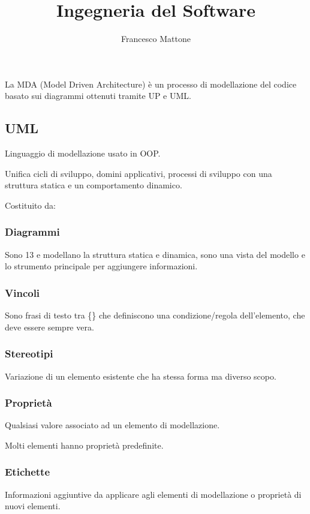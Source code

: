 \documentclass{report}
\title{Ingegneria del Software}
\author{Francesco Mattone}
\begin{document}
\tableofcontents
\maketitle

\chapter{}
La MDA (Model Driven Architecture) è un processo di modellazione del codice basato sui diagrammi ottenuti tramite UP e UML.

\section{UML}
Linguaggio di modellazione usato in OOP.

\noindent
Unifica cicli di sviluppo, domini applicativi, processi di sviluppo con una struttura statica e un comportamento dinamico.

\smallskip
\noindent
Costituito da:
\subsection*{Diagrammi}
Sono 13 e modellano la struttura statica e dinamica, sono una vista del modello e lo strumento principale per aggiungere informazioni.
\subsection*{Vincoli}
Sono frasi di testo tra \{\} che definiscono una condizione/regola dell'elemento, che deve essere sempre vera.
\subsection*{Stereotipi}
Variazione di un elemento esistente che ha stessa forma ma diverso scopo.
\subsection*{Proprietà}
Qualsiasi valore associato ad un elemento di modellazione.

\noindent
Molti elementi hanno proprietà predefinite.

\subsection*{Etichette}
Informazioni aggiuntive da applicare agli elementi di modellazione o proprietà di nuovi elementi.
\end{document}
